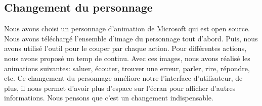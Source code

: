 \subsection{Changement du personnage}
\indent Nous avons choisi un personnage d'animation de Microsoft qui est open source. Nous avons téléchargé l'ensemble d'image du personnage tout d'abord. Puis, nous avons utilisé l'outil pour le couper par chaque action. Pour différentes actions, nous avons proposé un temp de continu. Avec ces images, nous avons réalisé les animations  suivantes: saluer, écouter, trouver une  erreur, parler, rire, répondre, etc. Ce changement du personnage améliore notre l'interface d'utilisateur, de plus, il nous permet d'avoir plus d'espace sur l'écran pour afficher d'autres informations. Nous pensons que c'est un changement indispensable.

\newpage
